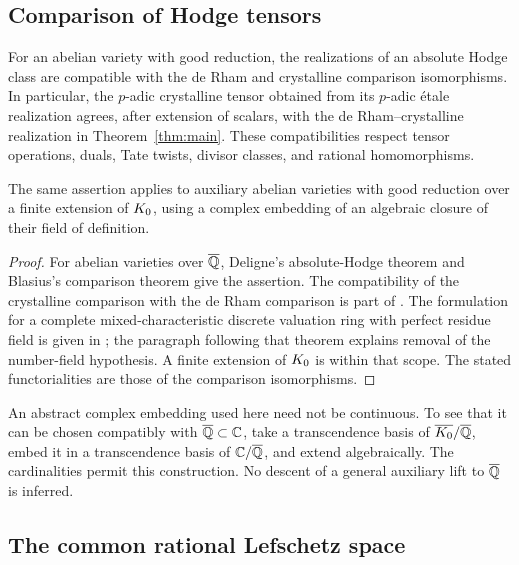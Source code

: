\subsection{Comparison of Hodge tensors}

\begin{lemma}\label{lem:comparison}
For an abelian variety with good reduction, the realizations of an
absolute Hodge class are compatible with the de Rham and crystalline
comparison isomorphisms. In particular, the \(p\)-adic crystalline tensor
obtained from its \(p\)-adic \'etale realization agrees, after extension of
scalars, with the de Rham--crystalline realization in
Theorem~\ref{thm:main}. These compatibilities respect tensor operations,
duals, Tate twists, divisor classes, and rational homomorphisms.

The same assertion applies to auxiliary abelian varieties with good
reduction over a finite extension of \(K_0\), using a complex
embedding of an algebraic closure of their field of definition.
\end{lemma}

\begin{proof}
For abelian varieties over \(\overline{\mathbb Q}\), Deligne's absolute-Hodge theorem
\cite[Main Theorem~2.11]{Deligne1982} and Blasius's comparison theorem
\cite[Theorems~0.3 and~5.3]{Blasius1994} give the assertion. The
compatibility of the crystalline comparison with the de Rham comparison
is part of \cite[\S5.1]{Blasius1994}. The formulation for a complete
mixed-characteristic discrete valuation ring with perfect residue field
is given in \cite[Theorem~5.6.3]{Moonen1998}; the paragraph following
that theorem explains removal of the number-field hypothesis. A finite
extension of \(K_0\) is within that scope. The stated functorialities
are those of the comparison isomorphisms.
\end{proof}

An abstract complex embedding used here need not be continuous. To see
that it can be chosen compatibly with \(\overline{\mathbb Q}\subset\mathbb C\), take a
transcendence basis of \(\overline{K_0}/\overline{\mathbb Q}\), embed it in a
transcendence basis of \(\mathbb C/\overline{\mathbb Q}\), and extend algebraically. The
cardinalities permit this construction. No descent of a general
auxiliary lift to \(\overline{\mathbb Q}\) is inferred.

\subsection{The common rational Lefschetz space}

